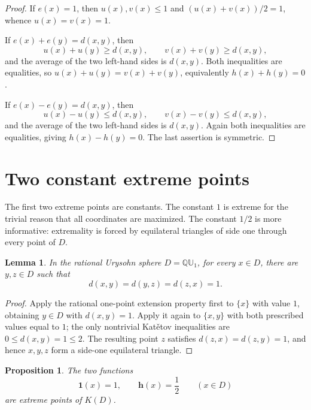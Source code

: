 \documentclass{proc-l}
\numberwithin{equation}{section}
\newtheorem{proposition}[theorem]{Proposition}
\newtheorem{lemma}[theorem]{Lemma}
\theoremstyle{definition}
\theoremstyle{remark}
\newcommand{\QU}{\mathbb Q\mathbb U}
\newcommand{\one}{\mathbf 1}
\newcommand{\half}{\mathbf h}
\begin{document}
\begin{proof}
If \(e(x)=1\), then \(u(x),v(x)\le1\) and \((u(x)+v(x))/2=1\), whence
\(u(x)=v(x)=1\).

If \(e(x)+e(y)=d(x,y)\), then
\[
        u(x)+u(y)\ge d(x,y),\qquad
        v(x)+v(y)\ge d(x,y),
\]
and the average of the two left-hand sides is \(d(x,y)\).  Both inequalities
are equalities, so \(u(x)+u(y)=v(x)+v(y)\), equivalently \(h(x)+h(y)=0\).

If \(e(x)-e(y)=d(x,y)\), then
\[
        u(x)-u(y)\le d(x,y),\qquad
        v(x)-v(y)\le d(x,y),
\]
and the average of the two left-hand sides is \(d(x,y)\).  Again both
inequalities are equalities, giving \(h(x)-h(y)=0\).  The last assertion is
symmetric.
\end{proof}

\section{Two constant extreme points}
\label{sec:constants}

The first two extreme points are constants.  The constant \(1\) is extreme for
the trivial reason that all coordinates are maximized.  The constant \(1/2\)
is more informative: extremality is forced by equilateral triangles of side
one through every point of \(D\).

\begin{lemma}\label{lem:equilateral-through-point}
In the rational Urysohn sphere \(D=\QU_1\), for every \(x\in D\), there are
\(y,z\in D\) such that
\[
        d(x,y)=d(y,z)=d(z,x)=1.
\]
\end{lemma}

\begin{proof}
Apply the rational one-point extension property first to \(\{x\}\) with value
\(1\), obtaining \(y\in D\) with \(d(x,y)=1\).  Apply it again to
\(\{x,y\}\) with both prescribed values equal to \(1\); the only nontrivial
Kat\v{e}tov inequalities are \(0\le d(x,y)=1\le2\).  The resulting point
\(z\) satisfies \(d(z,x)=d(z,y)=1\), and hence \(x,y,z\) form a side-one
equilateral triangle.
\end{proof}

\begin{proposition}\label{prop:constant-extreme}
The two functions
\[
        \one(x)=1,
        \qquad
        \half(x)=\frac12\qquad(x\in D)
\]
are extreme points of \(K(D)\).
\end{proposition}
\end{document}
